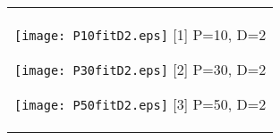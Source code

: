 \documentclass[a4paper,11pt,oneside,openany]{jsbook}
\begin{document}
\begin{figure}[htbp]
  \begin{center}
    \begin{tabular}{c}


      \begin{minipage}{0.33\hsize}
        \begin{center}
          \texttt{[image: P10fitD2.eps]}
          \hspace{1.2cm} [1] P=10, D=2
        \end{center}
      \end{minipage}

      \begin{minipage}{0.33\hsize}
        \begin{center}
          \texttt{[image: P30fitD2.eps]}
          \hspace{1.2cm} [2] P=30, D=2
        \end{center}
      \end{minipage}

      \begin{minipage}{0.33\hsize}
        \begin{center}
          \texttt{[image: P50fitD2.eps]}
          \hspace{1.2cm} [3] P=50, D=2
        \end{center}
      \end{minipage}
    \end{tabular}
  \end{center}
\end{figure}
\end{document}
